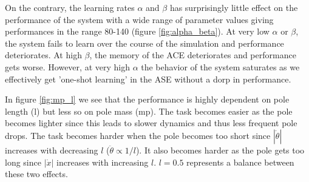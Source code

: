 \documentclass{article}
\begin{document}
On the contrary, the learning rates $\alpha$ and $\beta$ has surprisingly little effect on the performance of the system with a wide range of parameter values giving performances in the range 80-140 (figure \ref{fig:alpha_beta}). At very low $\alpha$ or $\beta$, the system fails to learn over the course of the simulation and performance deteriorates. At high $\beta$, the memory of the ACE deteriorates and performance gets worse. However, at very high $\alpha$ the behavior of the system saturates as we effectively get 'one-shot learning' in the ASE without a dorp in performance.

In figure \ref{fig:mp_l} we see that the performance is highly dependent on pole length (l) but less so on pole mass (mp). The task becomes easier as the pole becomes lighter since this leads to slower dynamics and thus less frequent pole drops. The task becomes harder when the pole becomes too short since $|\dot \theta|$ increases with decreasing $l$ ($\ddot \theta \propto 1/l$). It also becomes harder as the pole gets too long since $|\dot x|$ increases with increasing $l$. $l = 0.5$ represents a balance between these two effects. 
\end{document}
